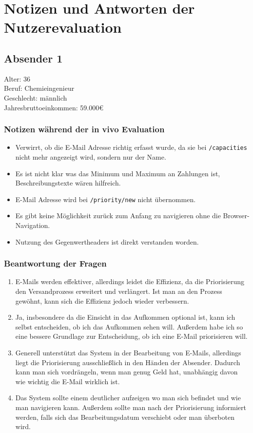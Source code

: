 \newpage
\section{Notizen und Antworten der Nutzerevaluation}
\label{Notizen_und_Antworten_der_Nutzerevaluation}

\subsection{Absender 1}
Alter: 36 \\
Beruf: Chemieingenieur \\
Geschlecht: männlich \\
Jahresbruttoeinkommen: 59.000€

\subsubsection*{Notizen während der in vivo Evaluation}
\begin{itemize}
    \item Verwirrt, ob die E-Mail Adresse richtig erfasst wurde, da sie bei \texttt{/capacities} nicht mehr angezeigt wird, sondern nur der Name.
    \item Es ist nicht klar was das Minimum und Maximum an Zahlungen ist, Beschreibungstexte wären hilfreich.
    \item E-Mail Adresse wird bei \texttt{/priority/new} nicht übernommen.
    \item Es gibt keine Möglichkeit zurück zum Anfang zu navigieren ohne die Browser-Navigation.
    \item Nutzung des Gegenwertheaders ist direkt verstanden worden.
\end{itemize}

\subsubsection*{Beantwortung der Fragen}
\begin{enumerate}
\item E-Mails werden effektiver, allerdings leidet die Effizienz, da die Priorisierung den Versandprozess erweitert und verlängert. Ist man an den Prozess gewöhnt, kann sich die Effizienz jedoch wieder verbessern.
\item Ja, insbesondere da die Einsicht in das Aufkommen optional ist, kann ich selbst entscheiden, ob ich das Aufkommen sehen will. Außerdem habe ich so eine bessere Grundlage zur Entscheidung, ob ich eine E-Mail priorisieren will.
\setcounter{enumi}{4}
\item Generell unterstützt das System in der Bearbeitung von E-Mails, allerdings liegt die Priorisierung ausschließlich in den Händen der Absender. Dadurch kann man sich vordrängeln, wenn man genug Geld hat, unabhängig davon wie wichtig die E-Mail wirklich ist.
\item Das System sollte einem deutlicher aufzeigen wo man sich befindet und wie man navigieren kann. Außerdem sollte man nach der Priorisierung informiert werden, falls sich das Bearbeitungsdatum verschiebt oder man überboten wird.
\end{enumerate}

